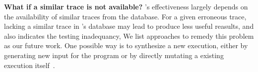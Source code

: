 
\vspace{1mm}
\noindent \textbf{What if a similar trace is not available?}
\ourtool's effectiveness largely depends on the availability of
similar traces from the database. For a given erroneous trace, lacking a similar
trace in \ourtool's database may lead \ourtool to produce
less useful reasults, and also indicates the testing inadequancy,
We list approaches to remedy this problem as our future work. One
possible way is to synthesize a new execution, either by
generating new input for the program or by directly mutating a
existing execution itself~\cite{sumnerICSE2011}.




